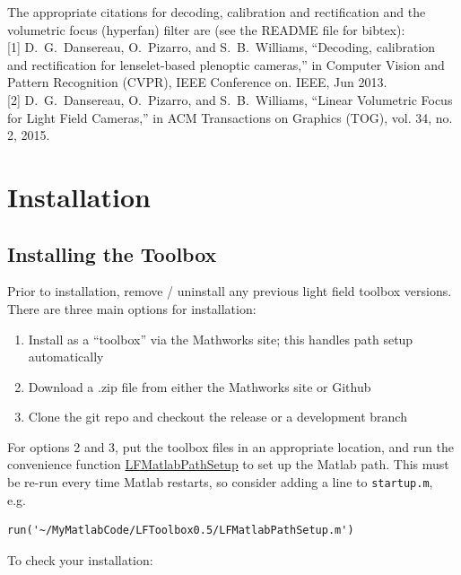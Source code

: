 \documentclass[onecolumn]{article}
\newcommand{\CiteFunction}[1]{\hyperlink{#1}{\small #1}}
\newcommand{\SymbolText}[1]{\texttt{\small #1}}
\begin{document}
The appropriate citations for decoding, calibration and rectification and the volumetric focus (hyperfan) filter are (see the README file for bibtex): \vspace{0.5em} \\ 
\footnotesize [1] \small{D.\ G.\ Dansereau, O.\ Pizarro, and S.\ B.\ Williams, ``Decoding, calibration and rectification for lenselet-based plenoptic cameras,'' in Computer Vision and Pattern Recognition (CVPR), IEEE Conference on. IEEE, Jun 2013.} \vspace{0.5em} \\ 
\footnotesize [2] \small{D.\ G.\ Dansereau, O.\ Pizarro, and S.\ B.\ Williams, ``Linear Volumetric Focus for Light Field Cameras,'' in ACM Transactions on Graphics (TOG), vol. 34, no. 2, 2015.}

\newpage
\tableofcontents
\newpage

\section{Installation}
\label{sect_Installation}

\subsection{Installing the Toolbox}

Prior to installation, remove / uninstall any previous light field toolbox versions. There are three main options for installation:
\begin{enumerate}[leftmargin=2.2em,itemsep=0em,rightmargin=0.5cm]
\item Install as a ``toolbox'' via the Mathworks site; this handles path setup automatically
\item Download a .zip file from either the Mathworks site or Github
\item Clone the git repo and checkout the release or a development branch
\end{enumerate}

For options 2 and 3, put the toolbox files in an appropriate location, and run the convenience function \CiteFunction{LFMatlabPathSetup} to set up the Matlab path. This must be re-run every time Matlab restarts, so consider adding a line to \SymbolText{startup.m}, e.g.\ \begin{Verbatim}
run('~/MyMatlabCode/LFToolbox0.5/LFMatlabPathSetup.m')
\end{Verbatim}

To check your installation:
\end{document}

